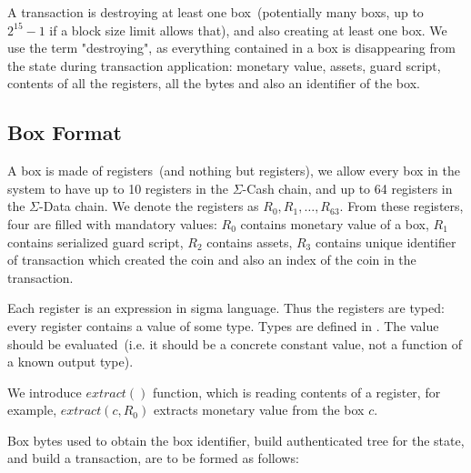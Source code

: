 \documentclass[]{article}   %
\newcommand{\authnote}[2]{\marginpar{\parbox{\marginparwidth}{\tiny %
  \textsf{#1 {\textcolor{blue}{notes: #2}}}}}%
  \textcolor{blue}{\textbf{\dag}}}
\newcommand{\authnote}[2]{
  \textsf{#1 \textcolor{blue}{: #2}}}
\newcommand{\authnote}[2]{}
\newcommand{\knote}[1]{{\authnote{\textcolor{green}{Alex notes}}{#1}}}
\newcommand{\ecash}{$\Sigma$-Cash}
\newcommand{\edata}{$\Sigma$-Data}
\newcommand{\coin}{box}
\newcommand{\Coin}{Box}
\newcommand{\sigm}{sigma}
\newcommand{\extract}[1]{$extract({#1})$}
\begin{document}
A transaction is destroying at least one \coin{}~(potentially many {\coin{}}s, up to $2^{15} - 1$ if a block size
limit allows that), and also creating at least one \coin{}. We use the term "destroying", as everything contained
in a \coin{} is disappearing from the state during transaction application: monetary value, assets,
guard script, contents of all the registers, all the bytes and also an identifier of the \coin{}.

\subsection{\Coin{} Format}
\label{box-format}

A \coin{} is made of registers~(and nothing but registers), we allow every \coin{} in the system to have up to 10 registers in the \ecash{} chain,
and up to 64 registers in the \edata{} chain. We denote the registers as $R_0,R_1,\ldots,R_{63}$.
From these registers, four are filled with mandatory values: $R_0$ contains monetary value of a \coin{}, $R_1$ contains
serialized guard script, $R_2$ contains assets, $R_3$ contains unique identifier of transaction which created the
coin and also an index of the coin in the transaction.

Each register is an expression in \sigm{} language. Thus the registers are typed: every register contains a value of
some type. Types are defined in \knote{ref}. The value should be evaluated~(i.e. it should be a concrete constant value,
not a function of a known output type).

We introduce \extract{} function, which is reading contents of a register, for example, \extract{c, R_0} extracts monetary value
from the \coin{} $c$.

\Coin{} bytes used to obtain the \coin{} identifier, build authenticated tree for the state, and build a transaction,
are to be formed as follows:
\end{document}
